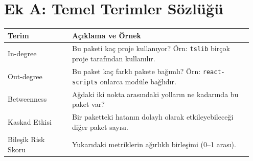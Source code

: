 \documentclass[11pt,a4paper]{article}
\begin{document}
\section*{Ek A: Temel Terimler Sözlüğü}
\begin{longtable}{@{}p{0.25\linewidth}p{0.7\linewidth}@{}}
\toprule
\textbf{Terim} & \textbf{Açıklama ve Örnek}\\
\midrule
In-degree & Bu paketi kaç proje kullanıyor? Örn: \texttt{tslib} birçok proje tarafından kullanılır.\\
Out-degree & Bu paket kaç farklı pakete bağımlı? Örn: \texttt{react-scripts} onlarca modüle bağlıdır.\\
Betweenness & Ağdaki iki nokta arasındaki yolların ne kadarında bu paket var?\\
Kaskad Etkisi & Bir paketteki hatanın dolaylı olarak etkileyebileceği diğer paket sayısı.\\
Bileşik Risk Skoru & Yukarıdaki metriklerin ağırlıklı birleşimi (0–1 arası).\\
\bottomrule
\end{longtable}
\end{document}
